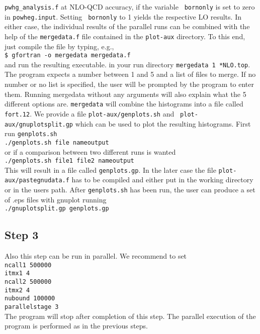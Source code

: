 \documentclass[a4paper,11pt]{article}
\begin{document}
{\tt pwhg\_analysis.f} at NLO-QCD accuracy, if the variable {\tt
  bornonly} is set to zero in {\tt powheg.input}.  Setting {\tt
  bornonly} to 1 yields the respective LO results. In either case, the
individual results of the parallel runs can be combined with the help
of the {\tt mergedata.f} file contained in the {\tt plot-aux}
directory.  To this end, just compile the file by typing, e.g.,
\\[2ex]
{\tt \$ gfortran -o mergedata mergedata.f}
\\[2ex]
and run the resulting executable. 
 in your run directory
{\tt mergedata 1 *NLO.top}. 
The program expects a number between 1 and 5 and a list of files to
merge. If no number or no list is specified, the user will be prompted
by the program to enter them. Running mergedata without any arguments
will also explain what the 5 different options are. {\tt mergedata}
will combine the histograms into a file called {\tt fort.12}. We
provide a file {\tt plot-aux/genplots.sh} and {\tt
  plot-aux/gnuplotsplit.gp} which can be used to plot the resulting
histograms. First run {\tt genplots.sh}
\\[2ex]
{\tt ./genplots.sh file nameoutput}
\\[2ex]
or if a comparison between two different runs is wanted
\\[2ex]
{\tt ./genplots.sh file1 file2 nameoutput}
\\[2ex]
This will result in a file called {\tt genplots.gp}. In the later case
the file {\tt plot-aux/pastegnudata.f} has to be compiled and either put
in the working directory or in the users
path. After {\tt genplots.sh} has been run, the user can produce a set
of .eps files with gnuplot running
\\[2ex]
{\tt ./gnuplotsplit.gp genplots.gp}
%
\subsection*{Step 3}
%
Also this step can be run in parallel. 
We recommend to set
\\[2ex]
{\tt ncall1 500000}
\\
{\tt itmx1 4}
\\
{\tt ncall2 500000}
\\
{\tt itmx2 4}
\\
{\tt nubound 100000}
\\
{\tt parallelstage  3}
\\[2ex]
%
The program will stop after
completion of this step.  The parallel execution of the program is
performed as in the previous steps.
%
\end{document}
